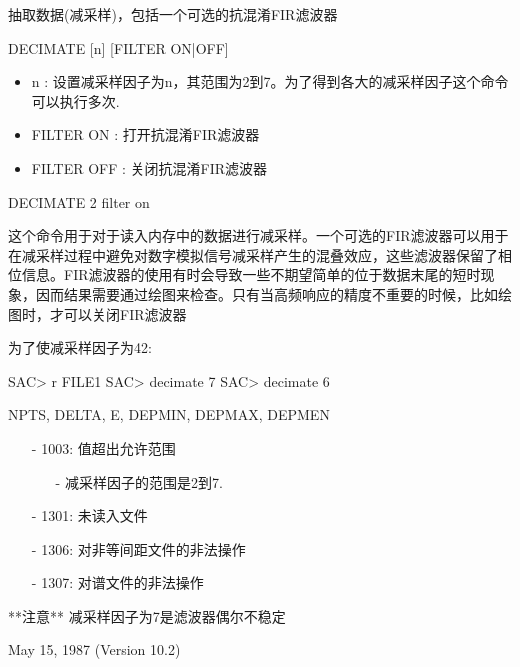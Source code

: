 \label{cmd:decimate}

抽取数据(减采样)，包括一个可选的抗混淆FIR滤波器

DECIMATE [n] [FILTER ON|OFF]

\begin{itemize}
\item n : 设置减采样因子为n，其范围为2到7。为了得到各大的减采样因子这个命令可以执行多次.
\item FILTER ON : 打开抗混淆FIR滤波器
\item FILTER OFF : 关闭抗混淆FIR滤波器
\end{itemize}

DECIMATE 2 filter on

这个命令用于对于读入内存中的数据进行减采样。一个可选的FIR滤波器可以用于在减采样过程中避免对数字模拟信号减采样产生的混叠效应，这些滤波器保留了相位信息。FIR滤波器的使用有时会导致一些不期望简单的位于数据末尾的短时现象，因而结果需要通过绘图来检查。只有当高频响应的精度不重要的时候，比如绘图时，才可以关闭FIR滤波器

为了使减采样因子为42:
\begin{SACCode}
SAC> r FILE1
SAC> decimate 7
SAC> decimate 6
\end{SACCode}

NPTS, DELTA, E, DEPMIN, DEPMAX, DEPMEN

\begin{itemize}
\item[-]1003: 值超出允许范围
	\begin{itemize}
  	\item[-]减采样因子的范围是2到7.
	\end{itemize}
\item[-]1301: 未读入文件
\item[-]1306: 对非等间距文件的非法操作
\item[-]1307: 对谱文件的非法操作
\end{itemize}
**注意** 减采样因子为7是滤波器偶尔不稳定

May 15, 1987 (Version 10.2)
